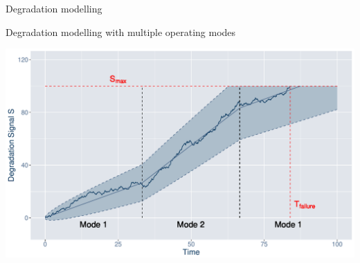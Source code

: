 \documentclass[slides]{beamer}
\begin{document}
\appendix
\begin{frame}[allowframebreaks]
    \tiny
    
    
\end{frame}

\begin{frame}{Degradation modelling}
    \centering
    
\end{frame}


\begin{frame}{Degradation modelling with multiple operating modes}
\begin{center}
    \includegraphics[scale=0.46]{example-wiener-om.pdf} \\
\end{center}
\end{frame}
\end{document}
